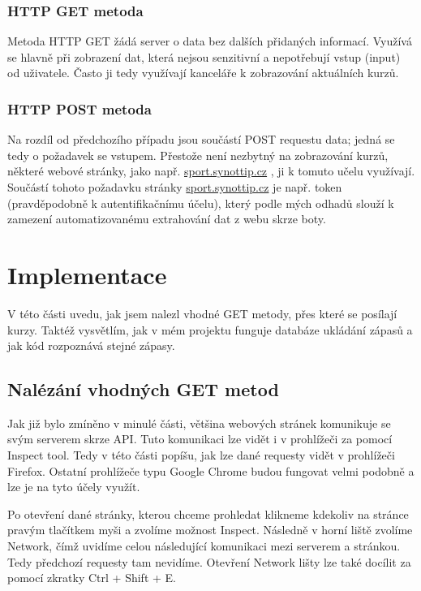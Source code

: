 \documentclass[11pt,a4paper,twoside,openright]{report}
\begin{document}
\subsection{HTTP GET metoda}
Metoda HTTP GET žádá server o data bez dalších přidaných informací. Využívá se hlavně při zobrazení dat, která nejsou senzitivní a nepotřebují vstup (input) od uživatele. \cite{gfg_getpost} Často ji tedy využívají kanceláře k zobrazování aktuálních kurzů.

\subsection{HTTP POST metoda}
Na rozdíl od předchozího případu jsou součástí POST requestu data; jedná se tedy o požadavek se vstupem. \cite{gfg_getpost} Přestože není nezbytný na zobrazování kurzů, některé webové stránky, jako např. \url{sport.synottip.cz} , ji k tomuto učelu využívají. Součástí tohoto požadavku stránky \url{sport.synottip.cz}  je  např. token (pravděpodobně k autentifikačnímu účelu), který podle mých odhadů slouží k zamezení automatizovanému extrahování dat z webu skrze boty. 

\chapter{Implementace}

V této části uvedu, jak jsem nalezl vhodné GET metody, přes které se posílají kurzy.  Taktéž vysvětlím, jak v mém projektu funguje databáze ukládání zápasů a jak kód rozpoznává stejné zápasy.

\section{Nalézání vhodných GET metod}
Jak již bylo zmíněno v minulé části, většina webových stránek komunikuje se svým serverem skrze API. Tuto komunikaci lze vidět i v prohlížeči za pomocí Inspect tool. Tedy v této části popíšu, jak lze dané requesty vidět v prohlížeči Firefox. Ostatní prohlížeče typu Google Chrome budou fungovat velmi podobně a lze je na tyto účely využít.

Po otevření dané stránky, kterou chceme prohledat klikneme kdekoliv na stránce pravým tlačítkem myši a zvolíme možnost Inspect. Následně v horní liště zvolíme Network, čímž uvidíme celou následující komunikaci mezi serverem a stránkou. Tedy předchozí requesty tam nevidíme. Otevření Network lišty lze také docílit za pomocí zkratky Ctrl + Shift + E. 
\end{document}
